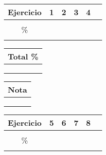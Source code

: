 \documentclass[a4paper,11pt,twoside,spanish]{amsbook}
\theoremstyle{definition}
\theoremstyle{remark}
\begin{document}
	\begin{tabular}{|c|c|c|c|cc|}
		\hline
		Ejercicio & \hspace{0.5cm} 1\hspace{0.5cm}  &\hspace{0.5cm}  2\hspace{0.5cm} & \hspace{0.5cm} 3\hspace{0.5cm} & \hspace{0.5cm} 4\hspace{0.5cm}&\\ \hline
		&  & & & &\\
		\% & &  & & & \\
		&  & & & &\\ \hline
	\end{tabular}
	\hspace*{0.5cm}
	\begin{tabular}{|c|}
		\hline
		\hspace{0.0cm} {\bf Total \%}\hspace{0.0cm}   \\ \hline
		\\
		\\
		\\ \hline
	\end{tabular}
	\hspace*{0.5cm}
	\begin{tabular}{|c|}
		\hline
		\hspace{0.3cm} {\bf Nota}\hspace{0.3cm}   \\ \hline
		\\
		\\
		\\ \hline
	\end{tabular}
	
		\begin{tabular}{|c|c|c|c|cc|}
		\hline
		Ejercicio & \hspace{0.5cm} 5\hspace{0.5cm}  &\hspace{0.5cm}  6\hspace{0.5cm} & \hspace{0.5cm} 7\hspace{0.5cm} & \hspace{0.5cm} 8\hspace{0.5cm}&\\ \hline
		&  & & & &\\
		\% & &  & & & \\
		&  & & & &\\ \hline
	\end{tabular}
	
\end{document}
